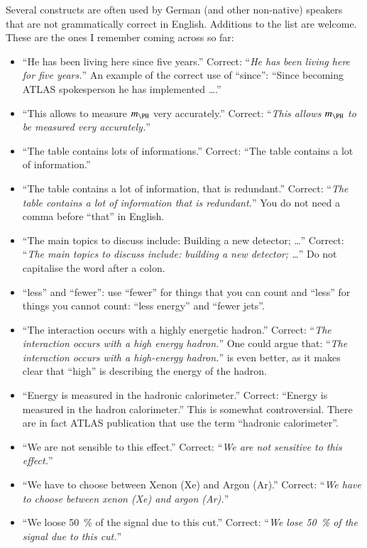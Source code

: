 Several constructs are often used by German (and other non-native) speakers
that are not grammatically correct in English.
Additions to the list are welcome.
These are the ones I remember coming across so far:
\begin{itemize}
\item \enquote{He has been living here since five years.}
  Correct: \enquote{\emph{He has been living here for five years.}}
  An example of the correct use of \enquote{since}:
  \enquote{Since becoming ATLAS spokesperson he has implemented \ldots.}
\item \enquote{This allows to measure $m_{\PH}$ very accurately.}
  Correct: \enquote{\emph{This allows $m_{\PH}$ to be measured very accurately.}}
\item \enquote{The table contains lots of informations.}
  Correct: \enquote{The table contains a lot of information.}
\item \enquote{The table contains a lot of information, that is redundant.}
  Correct: \enquote{\emph{The table contains a lot of information that is redundant.}}
  You do not need a comma before \enquote{that} in English.
\item \enquote{The main topics to discuss include: Building a new detector; \ldots}
  Correct: \enquote{\emph{The main topics to discuss include: building a new detector; \ldots}}
  Do not capitalise the word after a colon.
\item \enquote{less} and \enquote{fewer}: use \enquote{fewer} for things that you can count and
  \enquote{less} for things you cannot count: \enquote{less energy} and \enquote{fewer jets}.
\item \enquote{The interaction occurs with a highly energetic hadron.}
  Correct: \enquote{\emph{The interaction occurs with a high energy hadron.}}
  One could argue that: \enquote{\emph{The interaction occurs with a high-energy hadron.}}
  is even better, as it makes clear that \enquote{high} is describing the energy of the hadron.
\item \enquote{Energy is measured in the hadronic calorimeter.}
  Correct: \enquote{Energy is measured in the hadron calorimeter.}
  This is somewhat controversial. There are in fact ATLAS publication that use the term \enquote{hadronic calorimeter}.
\item \enquote{We are not sensible to this effect.}
  Correct: \enquote{\emph{We are not sensitive to this effect.}}
\item \enquote{We have to choose between Xenon (Xe)  and Argon (Ar).}
  Correct: \enquote{\emph{We have to choose between xenon (Xe) and argon (Ar).}}
\item \enquote{We loose \SI{50}{\%} of the signal due to this cut.}
  Correct: \enquote{\emph{We lose \SI{50}{\%} of the signal due to this cut.}}
\end{itemize}

